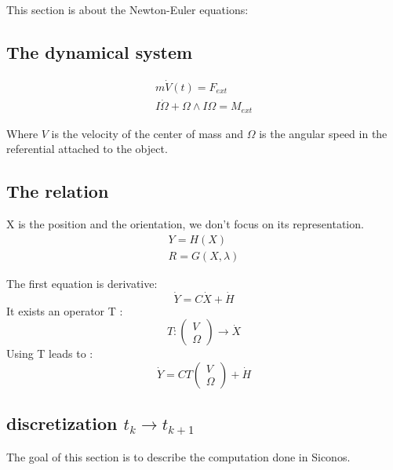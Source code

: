 This section is about the Newton-Euler equations:

\subsection{The dynamical system}

\begin{equation}
\label{NE_Dyn1}
\begin{array}{l}
m \dot{V}(t) = F_{ext}  \\
I \dot \Omega +\Omega \wedge I\Omega = M_{ext}
\end{array}
\end{equation}

Where $V$ is the velocity of the center of mass and $\Omega$ is the angular speed in the
referential attached to the object.

\subsection{The relation}
X is the position and the orientation, we don't focus on its representation.
\begin{equation}
\label{Relation}
\begin{array}{l}
Y=H(X)  \\
R=G(X,\lambda)
\end{array}
\end{equation}


The first equation is derivative:
\[\dot Y = C \dot X + \dot H\]
It exists an operator T :
\[T:  \left(\begin{array}{l} V\\ \Omega\end{array}\right) \to \dot X \]
  Using T leads to :
\[\dot Y = C T \left(\begin{array}{l} V\\ \Omega\end{array}\right) + \dot H\]

\subsection{discretization $t_k \to t_{k+1}$}
The goal of this section is to describe the computation done in Siconos.
